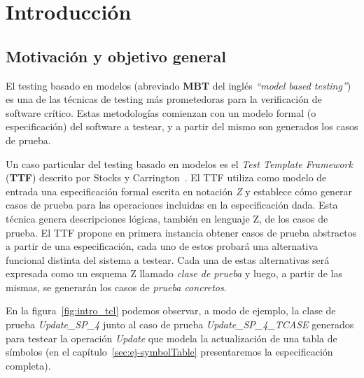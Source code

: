 \chapter{Introducción}
\label{introduccion}

\section{Motivación y objetivo general}
El testing basado en modelos (abreviado \textbf{MBT} del inglés \emph{``model based testing''}) es una de las técnicas de testing más prometedoras para la verificación de software crítico. Estas metodologías comienzan con un modelo formal (o especificación) del software a testear, y a partir del mismo son generados los casos de prueba.

Un caso particular del testing basado en modelos es el \emph{Test Template Framework} (\textbf{TTF}) descrito por Stocks y Carrington~\cite{stocks}. El TTF utiliza como modelo de entrada una especificación formal escrita en notación \emph{Z} y establece cómo generar casos de prueba para las operaciones incluidas en la especificación dada. Esta técnica genera descripciones lógicas, también en lenguaje Z, de los casos de prueba. El TTF propone en primera instancia obtener casos de prueba abstractos a partir de una especificación, cada uno de estos probará una alternativa funcional distinta del sistema a testear. Cada una de estas alternativas será expresada como un esquema Z llamado \emph{clase de prueba} y luego, a partir de las mismas, se generarán los casos de \emph{prueba concretos}.

En la figura~\ref{fig:intro_tcl} podemos observar, a modo de ejemplo, la clase de prueba \emph{Update\_SP\_4} junto al caso de prueba \emph{Update\_SP\_4\_TCASE} generados para testear la operación \emph{Update} que modela la actualización de una tabla de símbolos (en el capítulo~\ref{sec:ej-symbolTable} presentaremos la especificación completa).

